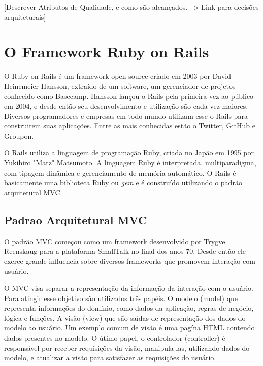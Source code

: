 [Descrever Atributos de Qualidade, e como são alcançados. --> Link para decisões arquiteturais]


\section{O Framework Ruby on Rails}

O Ruby on Rails é um framework open-source criado em 2003 por David Heinemeier Hansson, extraído de um software, um gerenciador de projetos conhecido como Basecamp.
Hansson lançou o Rails pela primeira vez ao público em 2004, e desde então seu desenvolvimento e utilização são cada vez maiores. Diversos programadores e empresas em todo mundo utilizam esse o Rails para construirem suas aplicações. Entre as mais conhecidas estão o Twitter, GitHub e Groupon. 

O Rails utiliza a linguagem de programação Ruby, criada no Japão em 1995 por Yukihiro "Matz" Matsumoto. A linguagem Ruby é interpretada, multiparadigma, com tipagem dinâmica e gerenciamento de memória automático. O Rails é basicamente uma biblioteca Ruby ou \textit{gem} e é construído utilizando o padrão arquitetural MVC.




\subsection{Padrao Arquitetural MVC}

O padrão MVC começou como um framework desenvolvido por Trygve Reenskaug para a plataforma SmallTalk no final dos anos 70. Desde então ele exerce grande influencia sobre diversos frameworks que promovem interação com usuário.

O MVC visa separar a representação da informação da interação com o usuário. Para atingir esse objetivo são utilizados três papéis. O modelo (model) que representa informações do domínio, como dados da aplicação, regras de negócio, lógica e funções. A visão (view) que são saídas de representação dos dados do modelo ao usuário. Um exemplo comum de visão é uma pagína HTML contendo dados presentes no modelo. O útimo papel, o controlador (controller) é responsável por receber requisições da visão, manipula-las, utilizando dados do modelo, e atualizar a visão para satisfazer as requisições do usuário.

